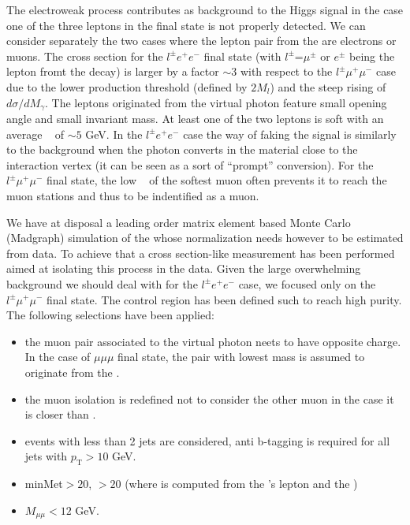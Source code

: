 The electroweak process \Wgstar contributes as background to the Higgs signal in the case one of the 
three leptons in the final state is not properly detected. 
We can consider separately the two cases where the lepton pair from the \Astar are electrons
or muons. The cross section for the \ensuremath{l^{\pm}e^{+}e^{-}} final state
(with \ensuremath{l^{\pm}}=\ensuremath{\mu^{\pm}} or \ensuremath{e^{\pm}} being the lepton fromt the \W decay) 
is larger by a factor $\sim3$ with respect to the \ensuremath{l^{\pm}\mu^{+}\mu^{-}} case
due to the lower production threshold 
(defined by \ensuremath{2M_{l}}) and the steep rising of \ensuremath{d\sigma/dM_{\gamma}}.
The leptons originated from the virtual photon feature small opening angle and small invariant mass.
At least one of the two leptons is soft with an average \pt~ of $\sim5$ GeV.
In the \ensuremath{l^{\pm}e^{+}e^{-}} case the way of faking the signal is similarly to the \wgamma background 
when the photon converts in the material close to the interaction vertex 
(it can be seen as a sort of ``prompt'' conversion). 
For the \ensuremath{l^{\pm}\mu^{+}\mu^{-}} final state, the low \pt~ of the softest muon often prevents
it to reach the muon stations and thus to be indentified as a muon.

We have at disposal a leading order matrix element based Monte Carlo (Madgraph) simulation
of the \Wgstar whose normalization needs however to be estimated from data.
To achieve that a cross section-like measurement has been performed 
aimed at isolating this process in the data.
Given the large overwhelming background we should deal with for the \ensuremath{l^{\pm}e^{+}e^{-}} 
case, we focused only on the \ensuremath{l^{\pm}\mu^{+}\mu^{-}} final state.
The \Wgstar control region has been defined such to reach high purity. 
The following selections have been applied:
\begin{itemize}
\item the muon pair associated to the virtual photon neets to have opposite charge. In the case of
\ensuremath{\mu\mu\mu} final state, the pair with lowest mass is assumed to originate from the \Astar.
\item the muon isolation is redefined not to consider the other muon in the case it is closer than .
\item events with less than 2 jets are considered, anti b-tagging is required for all jets with \ensuremath{p_\mathrm{T}>10} GeV.
\item minMet$>20$, \mt$>20$ (where \mt is computed from the \W's lepton and the \met)
\item \ensuremath{M_{\mu\mu}<12} GeV.
\end{itemize} 

